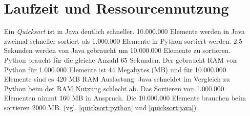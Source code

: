 \section{Laufzeit und Ressourcennutzung}
Ein \textit{Quicksort} ist in Java deutlich schneller. 10.000.000 Elemente werden in Java zweimal schneller sortiert als 1.000.000 Elemente in Python sortiert werden. 2,5 Sekunden werden von Java gebraucht um 10.000.000 Elemente zu sortieren. Python braucht für die gleiche Anzahl 65 Sekunden. Der gebraucht RAM von Python für 1.000.000 Elemente ist 44 Megabytes (MB) und für 10.000.000 Elemente sind es 420 MB RAM Auslastung. Java schneidet im Vergleich zu Python beim der RAM Nutzung schlecht ab. Das Sortieren von 1.000.000 Elementen nimmt 160 MB in Anspruch. Die 10.000.000 Elemente brauchen beim sortieren 2000 MB. (vgl. \ref{quicksort:python} und \ref{quicksort:java})
